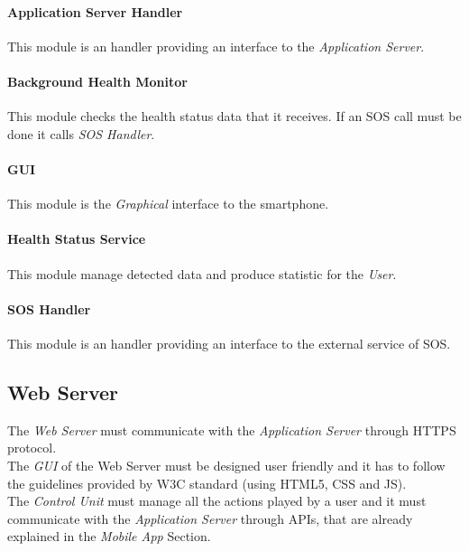 \paragraph{Application Server Handler}
This module is an handler providing an interface to the \textit{Application Server}.

\paragraph{Background Health Monitor}
This module checks the health status data that it receives. If an SOS call must be done it calls \textit{SOS Handler}.

\paragraph{GUI}
This module is the \textit{Graphical} interface to the smartphone.

\paragraph{Health Status Service}
This module manage detected data and produce statistic for the \textit{User}.

\paragraph{SOS Handler}
This module is an handler providing an interface to the external service of SOS.

\subsection{Web Server}
The \textit{Web Server} must communicate with the \textit{Application Server} through HTTPS protocol.\\
The \textit{GUI} of the \textit{}{Web Server} must be designed user friendly and it has to follow the guidelines provided by W3C standard (using HTML5, CSS and JS).\\
The \textit{Control Unit} must manage all the actions played by a user and it must communicate with the \textit{Application Server} through APIs, that are already explained in the \textit{Mobile App} Section.

